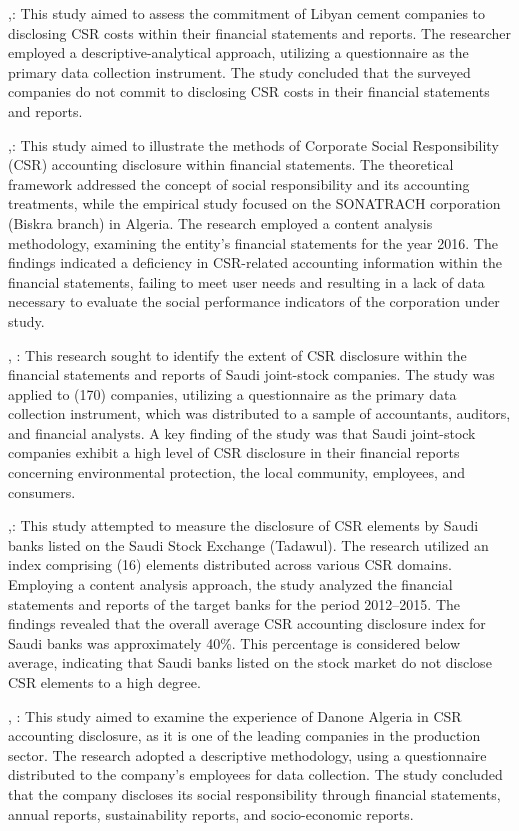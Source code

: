 \documentclass[10pt]{NSP1}
\begin{document}
\cite{ref23},: This study aimed to assess the commitment of Libyan cement companies to disclosing CSR costs within their financial statements and reports. The researcher employed a descriptive-analytical approach, utilizing a questionnaire as the primary data collection instrument. The study concluded that the surveyed companies do not commit to disclosing CSR costs in their financial statements and reports.

\cite{ref10},: This study aimed to illustrate the methods of Corporate Social Responsibility (CSR) accounting disclosure within financial statements. The theoretical framework addressed the concept of social responsibility and its accounting treatments, while the empirical study focused on the SONATRACH corporation (Biskra branch) in Algeria. The research employed a content analysis methodology, examining the entity's financial statements for the year 2016. The findings indicated a deficiency in CSR-related accounting information within the financial statements, failing to meet user needs and resulting in a lack of data necessary to evaluate the social performance indicators of the corporation under study.

\cite{ref27}, : This research sought to identify the extent of CSR disclosure within the financial statements and reports of Saudi joint-stock companies. The study was applied to (170) companies, utilizing a questionnaire as the primary data collection instrument, which was distributed to a sample of accountants, auditors, and financial analysts. A key finding of the study was that Saudi joint-stock companies exhibit a high level of CSR disclosure in their financial reports concerning environmental protection, the local community, employees, and consumers.

\cite{ref5},: This study attempted to measure the disclosure of CSR elements by Saudi banks listed on the Saudi Stock Exchange (Tadawul). The research utilized an index comprising (16) elements distributed across various CSR domains. Employing a content analysis approach, the study analyzed the financial statements and reports of the target banks for the period 2012–2015. The findings revealed that the overall average CSR accounting disclosure index for Saudi banks was approximately 40\%. This percentage is considered below average, indicating that Saudi banks listed on the stock market do not disclose CSR elements to a high degree.

\cite{ref22}, : This study aimed to examine the experience of Danone Algeria in CSR accounting disclosure, as it is one of the leading companies in the production sector. The research adopted a descriptive methodology, using a questionnaire distributed to the company’s employees for data collection. The study concluded that the company discloses its social responsibility through financial statements, annual reports, sustainability reports, and socio-economic reports.
\end{document}
